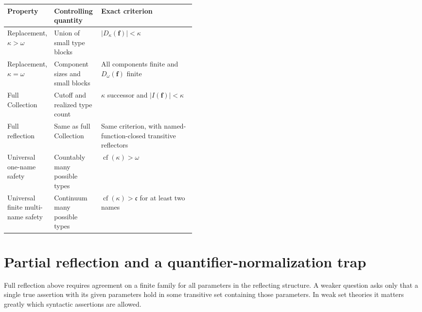 \documentclass[11pt,letterpaper]{article}
\numberwithin{equation}{section}
\theoremstyle{plain}
\theoremstyle{definition}
\theoremstyle{remark}
\newcommand{\cf}{\operatorname{cf}}
\newcommand{\cont}{\mathfrak c}
\begin{document}
\begin{center}
\begin{tabularx}{\linewidth}{@{}L{0.20\linewidth}L{0.25\linewidth}Y@{}}
\toprule
Property & Controlling quantity & Exact criterion\\
\midrule
Replacement, $\kappa>\omega$ & Union of small type blocks & $|D_\kappa(\boldsymbol f)|<\kappa$\\
Replacement, $\kappa=\omega$ & Component sizes and small blocks & All components finite and $D_\omega(\boldsymbol f)$ finite\\
Full Collection & Cutoff and realized type count & $\kappa$ successor and $|I(\boldsymbol f)|<\kappa$\\
Full reflection & Same as full Collection & Same criterion, with named-function-closed transitive reflectors\\
Universal one-name safety & Countably many possible types & $\cf(\kappa)>\omega$\\
Universal finite multi-name safety & Continuum many possible types & $\cf(\kappa)>\cont$ for at least two names\\
\bottomrule
\end{tabularx}
\end{center}

\section{Partial reflection and a quantifier-normalization trap}\label{nee:sec:partial}

Full reflection above requires agreement on a finite family for all parameters in the reflecting structure. A weaker question asks only that a single true assertion with its given parameters hold in some transitive set containing those parameters. In weak set theories it matters greatly which syntactic assertions are allowed.
\end{document}
